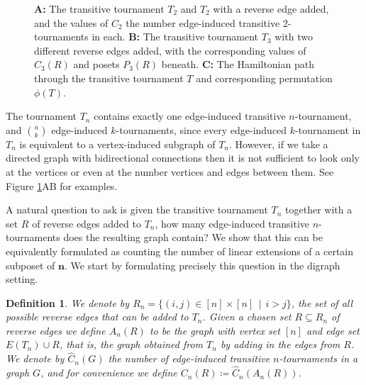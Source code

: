 \documentclass[9pt,a4paper,oneside]{article}
\newtheorem{definition}[theorem]{Definition}
\newcommand{\bn}{\mathbf{n}}
\begin{document}
\begin{figure}[h!]
\begin{center}
\end{center}
\caption{\textbf{A:} The transitive tournament $T_2$ and $T_2$ with a reverse edge added, and the values of $C_2$ the number edge-induced transitive 2-tournaments in each.
\textbf{B:} The transitive tournament $T_3$ with two different reverse edges added, with the corresponding values of $C_3(R)$ and posets $P_3(R)$ beneath.
\textbf{C:} The Hamiltonian path through the transitive tournament $T$ and corresponding permutation $\phi(T)$.  }
\label{fig:3_ways_basics}
\end{figure}



The tournament $T_n$ contains exactly one edge-induced transitive $n$-tournament, and $\binom{n}{k}$ edge-induced $k$-tournaments, since every edge-induced $k$-tournament in $T_n$ is equivalent to a vertex-induced subgraph of $T_n$.
However, if we take a directed graph with bidirectional connections then it is not sufficient to look only at the vertices or even at the number vertices and edges between them.  See Figure \ref{fig:3_ways_basics}AB for examples.


A natural question to ask is given the transitive tournament $T_n$ together with a set $R$ of reverse edges added to $T_n$, how many edge-induced transitive $n$-tournaments does the resulting graph contain?
We show that this can be equivalently formulated as counting the number of linear extensions of a certain subposet of $\bn$.
We start by formulating precisely this question in the digraph setting. 

\begin{definition}\label{def:reverse_edge_graph}
We denote by $R_n=\{(i,j)\in[n]\times[n]\,\mid \,i>j\}$, the set of \emph{all possible reverse edges} that can be added to $T_n$.
Given a chosen set $R\subseteq R_n$ of reverse edges we define $A_n(R)$ to be the graph with vertex set $[n]$ and edge set $E(T_n)\cup R$, that is, the graph obtained from $T_n$ by adding in the edges from $R$.
We denote by $\hat{C}_n(G)$ the number of edge-induced transitive $n$-tournaments in a graph $G$, and for convenience we define $C_n(R)\coloneqq\hat{C}_n(A_n(R))$. 
\end{definition}
 
\end{document}
